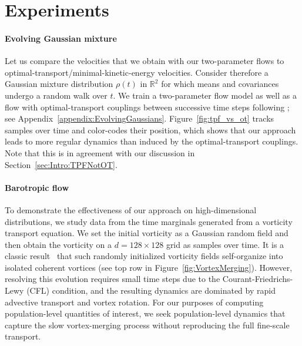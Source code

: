 \documentclass{article}
\theoremstyle{definition}
\theoremstyle{plain}
\theoremstyle{definition}
\theoremstyle{remark}
\begin{document}
\section{Experiments}

\paragraph{Evolving Gaussian mixture}
Let us compare the velocities that we obtain with our two-parameter flows to optimal-transport/minimal-kinetic-energy velocities. Consider therefore a Gaussian mixture distribution $\rho(t)$ in $\mathbb{R}^2$ for which means and covariances undergo a random walk over $t$. We train a two-parameter flow model as well as a flow with optimal-transport couplings between successive time steps following \citet{terpin_2024_learning}; see Appendix~\ref{appendix:EvolvingGaussians}. Figure~\ref{fig:tpf_vs_ot} tracks samples over time and color-codes their position, which shows that our approach leads to more regular dynamics than induced by the optimal-transport couplings. Note that this is in agreement with our discussion in Section~\ref{sec:Intro:TPFNotOT}.

\paragraph{Barotropic flow}
To demonstrate the effectiveness of our approach on high-dimensional distributions, we study data from the time marginals generated from a vorticity transport equation. We set the initial vorticity as a Gaussian random field and then obtain the vorticity on a $d = 128 \times 128$ grid as samples over time. It is a classic result~\cite{McWilliams1984CoherentVortices} that such randomly initialized vorticity fields self-organize into isolated coherent vortices (see top row in Figure~\ref{fig:VortexMerging}). However, resolving this evolution requires small time steps due to the Courant-Friedrichs-Lewy (CFL) condition, and the resulting dynamics are dominated by rapid advective transport and vortex rotation. For our purposes of computing population-level quantities of interest, we seek population-level dynamics that capture the slow vortex-merging process without reproducing the full fine-scale transport. 
\end{document}
